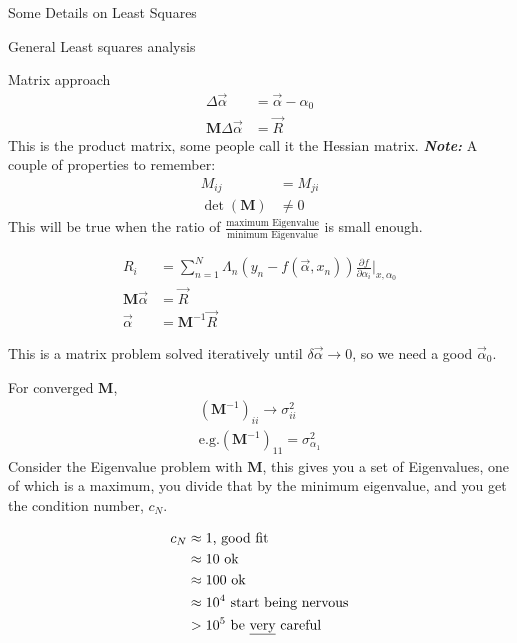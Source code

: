 \documentclass{article}
\newcommand{\pOne}[2]{\frac{\partial #1}{\partial #2}}
\newcommand{\matr}[1]{\bm{#1}}
\newcommand{\note}[1]{%
	\vspace{\parsep}%
	\textit{\textbf{Note: }}#1 \newline\newline
	\vspace{\parsep}}
\begin{document}
\begin{section}{Some Details on Least Squares}
\begin{subsection}{General Least squares analysis}
\begin{subsection}{Matrix approach}
\begin{align*}
		\Delta \vec{\alpha} &= \vec{\alpha} - \alpha_0\\
		\matr{M}\Delta \vec{\alpha} &= \vec{R}
	\end{align*}
	This is the product matrix, some people call it the Hessian matrix.
	\note{A couple of properties to remember:
		\begin{align*}
			M_{ij} &= M_{ji}\\
			\det{(\matr{M})} &\neq 0
		\end{align*}
		This will be true when the ratio of $\frac{\text{maximum Eigenvalue}}{\text{minimum Eigenvalue}}$ is small enough.}
\end{subsection}

	\begin{align*}
		R_i &= \sum_{n=1}^{N}\Lambda_n(y_n - f(\vec{\alpha},x_n))\pOne{f}{\alpha_i}\Big|_{x,\alpha_0}\\
		\matr{M}\vec{\alpha}&=\vec{R}\\
		\vec{\alpha}&=\matr{M}^{-1}\vec{R}
	\end{align*}

	This is a matrix problem solved iteratively until $\delta\vec{\alpha} \rightarrow 0$, so we need a good $\vec{\alpha}_0$.

	For converged $\matr{M}$, 
	\begin{align*}
		(\matr{M}^{-1})_{ii} \rightarrow \sigma_{ii}^2\\
		\text{e.g.} (\matr{M}^{-1})_{11} = \sigma_{\alpha_1}^2
	\end{align*}
	Consider the Eigenvalue problem with $\matr{M}$, this gives you a set of Eigenvalues, one of which is a maximum, you divide that by the minimum eigenvalue, and you get the condition number, $c_N$.

	\begin{align*}
		c_N &\approx 1\text{, good fit}\\
		&\approx 10\text{ ok}\\
		&\approx 100\text{ ok}\\
		&\approx 10^4\text{ start being nervous}\\
		&> 10^5\text{ be \underline{very} careful}
	\end{align*}


\end{subsection}
\end{section}
\end{document}
